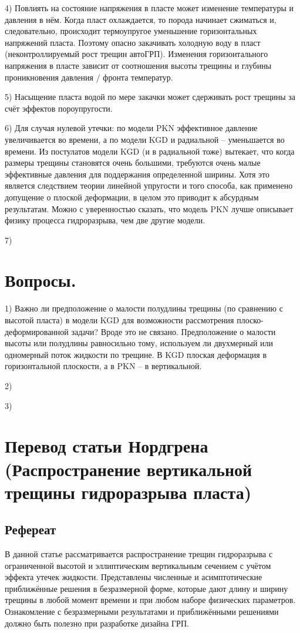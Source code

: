 \documentclass[a4paper, 11pt]{article}
\begin{document}
4) Повлиять на состояние напряжения в пласте может изменение температуры и давления в нём.
Когда пласт охлаждается, то порода начинает сжиматься и, следовательно, происходит термоупругое уменьшение горизонтальных напряжений пласта.
Поэтому опасно закачивать холодную воду в пласт (неконтроллируемый рост трещин автоГРП).
Изменения горизонтального напряжения в пласте зависит от соотношения высоты трещины и глубины проникновения давления / фронта температур.

5) Насыщение пласта водой по мере закачки может сдерживать рост трещины за счёт эффектов пороупругости.

6) Для случая нулевой утечки: по модели PKN эффективное давление увеличивается во времени, а по модели KGD и радиальной -- уменьшается во времени.
Из постулатов модели KGD (и в радиальной тоже) вытекает, что когда размеры трещины становятся очень большими, требуются очень малые эффективные давления для поддержания определенной ширины.
Хотя это является следствием теории линейной упругости и того способа, как применено допущение о плоской деформации, в целом это приводит к абсурдным результатам.
Можно с уверенностью сказать, что модель PKN лучше описывает физику процесса гидроразрыва, чем две другие модели.

7)
\\

\section{Вопросы.}

1) Важно ли предположение о малости полудлины трещины (по сравнению с высотой пласта) в модели KGD для возможности рассмотрения плоско-деформированной задачи?
Вроде это не связано.
Предположение о малости высоты или полудлины равносильно тому, используем ли двухмерный или одномерный поток жидкости по трещине.
В KGD плоская деформация в горизонтальной плоскости, а в PKN -- в вертикальной.

2) 

3)

\newpage
\section{Перевод статьи Нордгрена (Распространение вертикальной трещины гидроразрыва пласта)}

\subsection{Рефереат}
В данной статье рассматривается распространение трещин гидроразрыва с ограниченной высотой и эллиптическим вертикальным сечением с учётом эффекта утечек жидкости.
Представлены численные и асимптотические приближённые решения в безразмерной форме, которые дают длину и ширину трещины в любой момент времени и при любом наборе физических параметров.
Ознакомление с безразмерными результатами и приближёнными решениями должно быть полезно при разработке дизайна ГРП.
\end{document}
